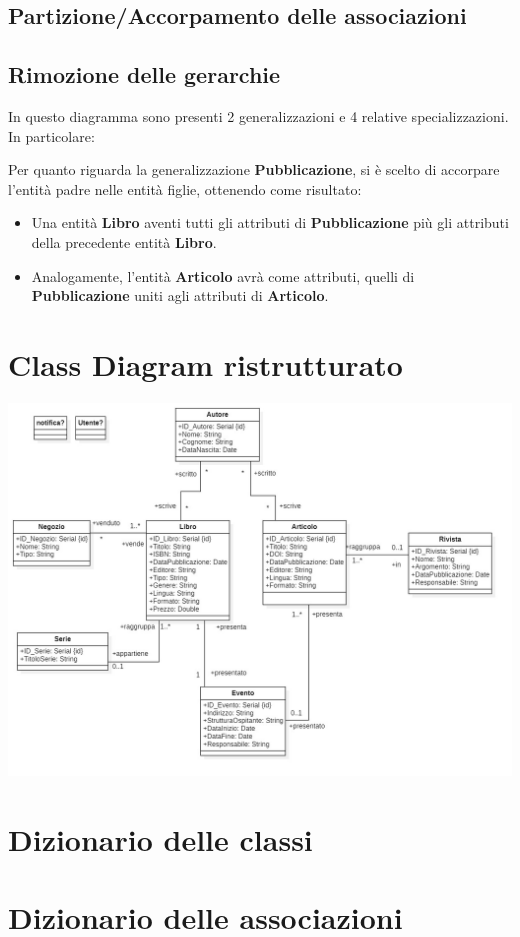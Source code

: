         \subsection{Partizione/Accorpamento delle associazioni}
            
        \subsection{Rimozione delle gerarchie}
            In questo diagramma sono presenti 2 generalizzazioni e 4 relative specializzazioni.
            In particolare:

            Per quanto riguarda la generalizzazione \textbf{Pubblicazione}, si è scelto di accorpare l'entità padre
            nelle entità figlie, ottenendo come risultato:
            \begin{itemize}
                  \item Una entità \textbf{Libro} aventi tutti gli attributi di \textbf{Pubblicazione} più
                        gli attributi della precedente entità \textbf{Libro}.
                  \item Analogamente, l'entità \textbf{Articolo} avrà come attributi, quelli di \textbf{Pubblicazione}
                        uniti agli attributi di \textbf{Articolo}.
            \end{itemize}
    
    \section{Class Diagram ristrutturato}
    \includegraphics[scale=0.25]{Immagini/UMLris_v1_0.png}
        
    \section{Dizionario delle classi}
        
    \section{Dizionario delle associazioni}